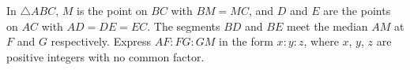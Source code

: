 In $\triangle ABC$, $M$ is the point on $BC$ with $BM=MC$, and $D$ and $E$ are the points on $AC$ with $AD=DE=EC$. The segments $BD$ and $BE$ meet the median $AM$ at $F$ and $G$ respectively. Express $AF:FG:GM$ in the form $x:y:z$, where $x$, $y$, $z$ are positive integers with no common factor.
